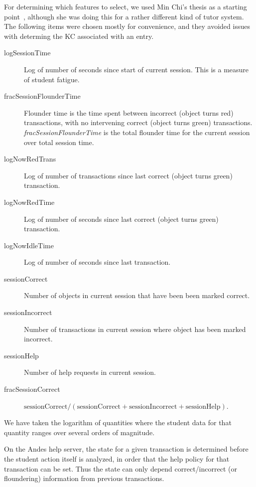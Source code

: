 \documentclass{edm_template}
\begin{document}
For determining which features to select, we used Min Chi's thesis
as a starting point~\citeyear{chi_micro-level_2009}, 
although she was doing this for a
rather different kind of tutor system.  The following items were
chosen mostly for convenience, and they avoided issues with determing
the KC associated with an entry.
%
\begin{description}

\item[logSessionTime] Log of number of seconds since start of current
  session.  This is a measure of student fatigue.

\item[fracSessionFlounderTime] Flounder time is the time spent between 
incorrect (object turns red) transactions, with no intervening correct 
(object turns green) transactions. 
 {\em fracSessionFlounderTime} is the total flounder
time for the current session over total session time.

\item[logNowRedTrans] Log of number of transactions since last
  correct (object turns green) transaction.

\item[logNowRedTime] Log of number of seconds since last
  correct (object turns green) transaction.

\item[logNowIdleTime] Log of number of seconds since last transaction.

\item[sessionCorrect] Number of objects in current session that have
  been  been marked  correct.

\item[sessionIncorrect] Number of transactions in current session where 
   object has been marked  incorrect.

\item[sessionHelp] Number of help requests in current session.

\item[fracSessionCorrect] $\mbox{sessionCorrect}/\left(\mbox{sessionCorrect}+\mbox{sessionIncorrect}+\mbox{sessionHelp}\right)$.

\end{description}
%
We have taken the logarithm of quantities where the student data
for that quantity ranges over several orders of magnitude.

On the Andes help server, the state for a given transaction 
is determined before the student action itself is analyzed,
in order that the help policy for that transaction can be set.  
Thus the state can only depend correct/incorrect (or floundering) 
information from previous transactions. 
\end{document}
